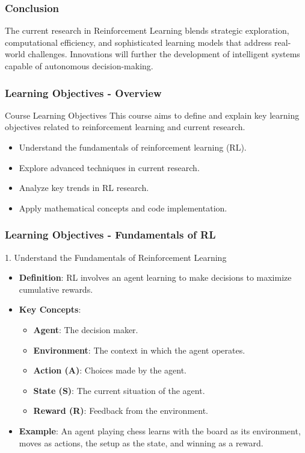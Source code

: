 \documentclass[aspectratio=169]{beamer}
\begin{document}
\begin{frame}[fragile]
    \frametitle{Conclusion}
    The current research in Reinforcement Learning blends strategic exploration, computational efficiency, and sophisticated learning models that address real-world challenges. Innovations will further the development of intelligent systems capable of autonomous decision-making.
\end{frame}

\begin{frame}[fragile]
    \frametitle{Learning Objectives - Overview}
    \begin{block}{Course Learning Objectives}
        This course aims to define and explain key learning objectives related to reinforcement learning and current research. 
    \end{block}
    \begin{itemize}
        \item Understand the fundamentals of reinforcement learning (RL).
        \item Explore advanced techniques in current research.
        \item Analyze key trends in RL research.
        \item Apply mathematical concepts and code implementation.
    \end{itemize}
\end{frame}

\begin{frame}[fragile]
    \frametitle{Learning Objectives - Fundamentals of RL}
    \begin{block}{1. Understand the Fundamentals of Reinforcement Learning}
        \begin{itemize}
            \item \textbf{Definition}: RL involves an agent learning to make decisions to maximize cumulative rewards.
            \item \textbf{Key Concepts}:
                \begin{itemize}
                    \item \textbf{Agent}: The decision maker.
                    \item \textbf{Environment}: The context in which the agent operates.
                    \item \textbf{Action (A)}: Choices made by the agent.
                    \item \textbf{State (S)}: The current situation of the agent.
                    \item \textbf{Reward (R)}: Feedback from the environment.
                \end{itemize}
            \item \textbf{Example}: An agent playing chess learns with the board as its environment, moves as actions, the setup as the state, and winning as a reward.
        \end{itemize}
    \end{block}
\end{frame}
\end{document}
